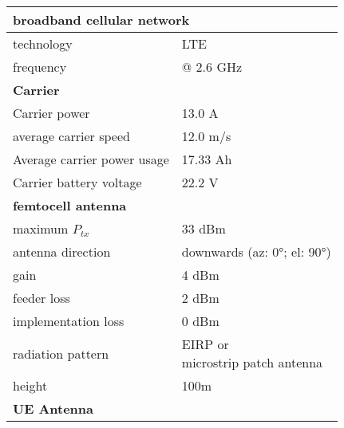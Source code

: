 \begin{table}[!htb]
\centering
\begin{tabular}[t]{ll}
        \toprule
        \multicolumn{2}{l}{\textbf{broadband cellular network}} \\
        \hline
        \hspace{3mm}  technology        & LTE     \\
        \hspace{3mm}  frequency         & @ 2.6 GHz \\
        \hline
        \multicolumn{2}{l}{\textbf{Carrier}} \\
        \hline  
        \hspace{3mm}  Carrier power        & 13.0 A   \\
        \hspace{3mm}  average carrier speed        & 12.0 m/s \\
        \hspace{3mm}  Average carrier power usage      & 17.33 Ah    \\
        \hspace{3mm}  Carrier battery voltage       & 22.2 V \\
        \hline
        \multicolumn{2}{l}{\textbf{femtocell antenna}} \\
        \hline  
        \hspace{3mm}  maximum $P_{tx}$          & 33 dBm   \\
        \hspace{3mm}  antenna  direction        & downwards (az: \ang{0}; el: \ang{90})    \\ 
        \hspace{3mm}  gain                      & 4 dBm   \\ 
        \hspace{3mm}  feeder loss               & 2 dBm   \\ 
        \hspace{3mm}  implementation loss       & 0 dBm   \\
        \hspace{3mm}  radiation pattern         & \shortstack[l]{\gls{EIRP} or \\ microstrip patch antenna } \\
        \hspace{3mm}  height                    & 100m  \\
        \hline
        \multicolumn{2}{l}{\textbf{\gls{UE} Antenna}} \\
        \hline 

\end{tabular}
\end{table}
